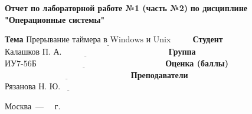 \begin{titlepage}
	
	\begin{center}
		\Large\textbf{  Отчет по лабораторной работе №1 (часть №2)}\newline
		\textbf{по дисциплине "Операционные системы"}\newline\newline
	\end{center}
	
\noindent\textbf{Тема} $\underline{\text{Прерывание таймера в Windows и Unix~~~~~~~}}$\newline\newline
\noindent\textbf{Студент} $\underline{\text{Калашков П. А.~~~~~~~~~~~~~~~~~~~~~~~~~~~~~~~~~~~~~~}}$\newline\newline
\noindent\textbf{Группа} $\underline{\text{ИУ7-56Б~~~~~~~~~~~~~~~~~~~~~~~~~~~~~~~~~~~~~~~~~~~~~~}}$\newline\newline
\noindent\textbf{Оценка (баллы)} $\underline{\text{~~~~~~~~~~~~~~~~~~~~~~~~~~~~~~~~~~~~~~~~~~~~~}}$\newline\newline
\noindent\textbf{Преподаватели} $\underline{\text{Рязанова Н. Ю.~~~~~~~~~~~~~~~~~~~~~~~~~~}}$\newline\newline\newline

	
	\begin{center}
		\vfill
		Москва~---~\the\year
		~г.
	\end{center}
	\restoregeometry
\end{titlepage}

